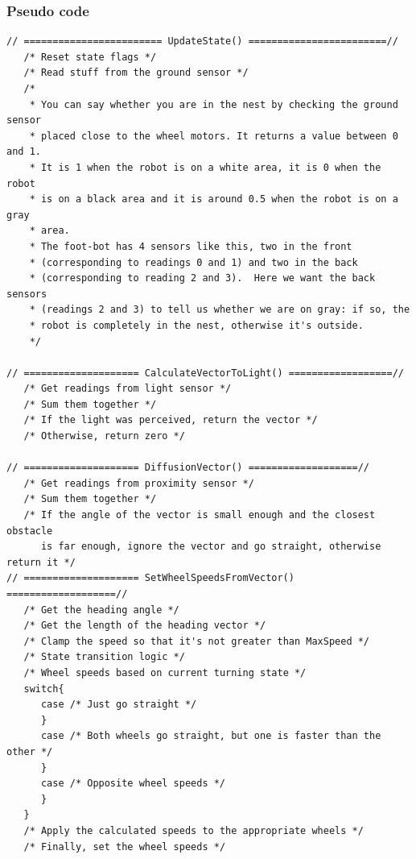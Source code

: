 \subsubsection{Pseudo code}
\begin{verbatim}
// ======================== UpdateState() ========================//
   /* Reset state flags */
   /* Read stuff from the ground sensor */
   /*
    * You can say whether you are in the nest by checking the ground sensor
    * placed close to the wheel motors. It returns a value between 0 and 1.
    * It is 1 when the robot is on a white area, it is 0 when the robot
    * is on a black area and it is around 0.5 when the robot is on a gray
    * area. 
    * The foot-bot has 4 sensors like this, two in the front
    * (corresponding to readings 0 and 1) and two in the back
    * (corresponding to reading 2 and 3).  Here we want the back sensors
    * (readings 2 and 3) to tell us whether we are on gray: if so, the
    * robot is completely in the nest, otherwise it's outside.
    */

// ==================== CalculateVectorToLight() ==================//
   /* Get readings from light sensor */
   /* Sum them together */
   /* If the light was perceived, return the vector */
   /* Otherwise, return zero */

// ==================== DiffusionVector() ===================//
   /* Get readings from proximity sensor */
   /* Sum them together */
   /* If the angle of the vector is small enough and the closest obstacle
      is far enough, ignore the vector and go straight, otherwise return it */
// ==================== SetWheelSpeedsFromVector() ===================//
   /* Get the heading angle */
   /* Get the length of the heading vector */
   /* Clamp the speed so that it's not greater than MaxSpeed */
   /* State transition logic */
   /* Wheel speeds based on current turning state */
   switch{
      case /* Just go straight */
      }
      case /* Both wheels go straight, but one is faster than the other */
      }
      case /* Opposite wheel speeds */
      }
   }
   /* Apply the calculated speeds to the appropriate wheels */
   /* Finally, set the wheel speeds */
   

\end{verbatim}
